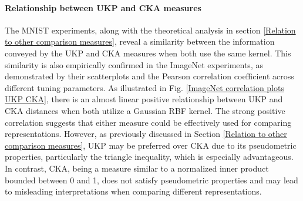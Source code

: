 \documentclass{article}
\theoremstyle{plain}
\newcommand{\metricstname}{UKP }
\begin{document}
\paragraph{Relationship between UKP and CKA measures}

The MNIST experiments, along with the theoretical analysis in section \ref{Relation to other comparison measures}, reveal a similarity between the information conveyed by the \metricstname and CKA measures when both use the same kernel. This similarity is also empirically confirmed in the ImageNet experiments, as demonstrated by their scatterplots and the Pearson correlation coefficient across different tuning parameters. As illustrated in Fig. \ref{ImageNet correlation plots UKP CKA}, there is an almost linear positive relationship between \metricstname and CKA distances when both utilize a Gaussian RBF kernel. The strong positive correlation suggests that either measure could be effectively used for comparing representations. However, as previously discussed in Section \ref{Relation to other comparison measures}, \metricstname may be preferred over CKA due to its pseudometric properties, particularly the triangle inequality, which is especially advantageous. In contrast, CKA, being a measure similar to a normalized inner product bounded between 0 and 1, does not satisfy pseudometric properties and may lead to misleading interpretations when comparing different representations.
\end{document}
